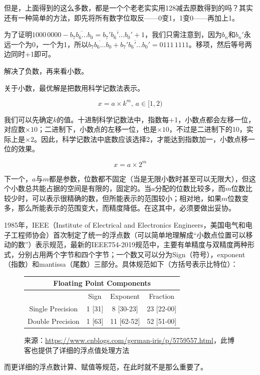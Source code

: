 \documentclass[UTF8]{ctexart}
\begin{document}
但是，上面得到的这么多数，都是一个个老老实实用128减去原数得到的吗？其实还有一种简单的方法，即先将所有数字位取反——0变1，1变0——再加上1。

为了证明$1000\,0000-\overline{b_7b_6...b_0}=\overline{b_7'b_6'...b_0'}+1$，我们只需注意到，因为$b_n$和$b_n'$永远一个为0，一个为1，所以$\overline{b_7b_6...b_0}+\overline{b_7'b_6'...b_0'}=0111\,1111$。移项，然后等号两边同时+1即可。

解决了负数，再来看小数。

关于小数，最优解是把数用科学记数法表示。 

\[x=a\times k^m,\,a\in[1,2)\]

我们可以先确定$k$的值。十进制科学记数法中，指数每+1，小数点都会左移一位，对应数$\times 10$；二进制下，小数点的左移一位，也是$\times 10$，不过是二进制下的10，实际上是$\times 2$。因此，科学记数法中底数应该选择2，才能达到指数加一，小数点移一位的效果。

\[x=a\times 2^m\]

下一个，$a$与$m$都是参数，位数都不固定（当是无限小数时甚至可以无限大），但这个小数总共能占据的空间是有限的，固定的。当$a$分配的位数比较多，而$m$位数比较少时，可以表示很精确的数，但所能表示的范围较小；相对地，如果$m$位数变多，那么所能表示的范围变大，而精度降低。在这其中，必须要做出妥协。

1985年，IEEE（Institute of Electrical and Electronics Engineers，美国电气和电子工程师协会）首次制定了统一的浮点数（可以简单地理解成“小数点位置可以移动的数”）表示规范，最新的IEEE754-2019规范中，主要有单精度与双精度两种形式，分别占用两个字节和四个字节；一个数又可以分为Sign（符号），exponent（指数）和mantissa（尾数）三部分。具体规范如下（方括号表示比特位）：

\begin{figure}
    \begin{tabular}{|c|c|c|c|}
        \multicolumn{4}{c}{Floating Point Components}\\\hline
        &Sign&Exponent&Fraction\\\hline
        Single Precision&1 [31]&8 [30-23]&23 [22-00]\\\hline
        Double Precision&1 [63]&11 [62-52]&52 [51-00]\\\hline
    \end{tabular}
\caption*{来源：\url{https://www.cnblogs.com/german-iris/p/5759557.html}，此博客也提供了详细的浮点值处理方法}
\end{figure}

而更详细的浮点数计算、赋值等规范，在此时就不是那么重要了。
\end{document}
